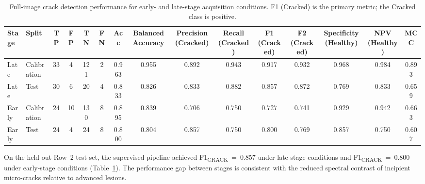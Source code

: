 \begin{landscape}
\thispagestyle{plain}
\FloatBarrier

\begin{table}[H]
\centering
\caption[Full-image crack detection: early- and late-stage performance]{Full-image crack detection performance for early- and late-stage acquisition conditions. F1 (Cracked) is the primary metric; the Cracked class is positive.}
\label{tab:full_image_early_late_metrics}

\small
\renewcommand{\arraystretch}{1.15}
\setlength{\tabcolsep}{5pt}

\begin{adjustbox}{max width=\linewidth,center}
\begin{tabular}{@{}llccccccccccccc@{}}

\toprule
Stage &
Split &
TP &
FP &
TN &
FN &
Acc &
Balanced Accuracy &
Precision (Cracked) &
Recall (Cracked) &
F1 (Cracked) &
F2 (Cracked) &
Specificity (Healthy) &
NPV (Healthy) &
MCC \\
\midrule

Late & Calibration &
33 & 4 & 121 & 2 &
0.963 & 0.955 & 0.892 & 0.943 & 0.917 & 0.932 & 0.968 & 0.984 & 0.893 \\

Late & Test &
30 & 6 & 20 & 4 &
0.833 & 0.826 & 0.833 & 0.882 & 0.857 & 0.872 & 0.769 & 0.833 & 0.659 \\

\addlinespace[3pt]

Early & Calibration &
24 & 10 & 130 & 8 &
0.895 & 0.839 & 0.706 & 0.750 & 0.727 & 0.741 & 0.929 & 0.942 & 0.663 \\

Early & Test &
24 & 4 & 24 & 8 &
0.800 & 0.804 & 0.857 & 0.750 & 0.800 & 0.769 & 0.857 & 0.750 & 0.607 \\

\bottomrule
\end{tabular}
\end{adjustbox}
\end{table}

\vspace{-4pt}
\noindent
On the held-out Row~2 test set, the supervised pipeline achieved F1\textsubscript{CRACK}~=~0.857 under late-stage conditions and F1\textsubscript{CRACK}~=~0.800 under early-stage conditions (Table~\ref{tab:full_image_early_late_metrics}). The performance gap between stages is consistent with the reduced spectral contrast of incipient micro-cracks relative to advanced lesions.


\end{landscape}
